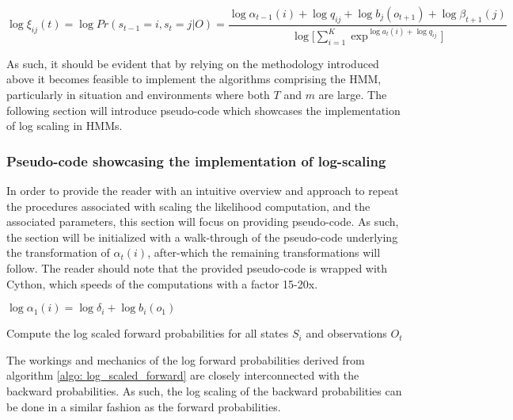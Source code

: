 \begin{equation}
    \log\xi_{ij}(t) = \log Pr(s_{t-1}=i, s_t=j|O) =
    \frac{\log\alpha_{t-1}(i) + \log q_{ij} + \log b_j(o_{t+1}) + \log \beta_{t+1}(j)}{\log\Big[\sum_{i=1}^K \exp^{\log a_t(i)+\log q_{ij}}\Big]}
    \label{eq: log xi}
\end{equation}

As such, it should be evident that by relying on the methodology introduced above it becomes feasible to implement the algorithms comprising the HMM, particularly in situation and environments where both $T$ and $m$ are large. The following section will introduce pseudo-code which showcases the implementation of log scaling in HMMs. 

\subsubsection{Pseudo-code showcasing the implementation of log-scaling}
In order to provide the reader with an intuitive overview and approach to repeat the procedures associated with scaling the likelihood computation, and the associated parameters, this section will focus on providing pseudo-code. As such, the section will be initialized with a walk-through of the pseudo-code underlying the transformation of $\alpha_t(i)$, after-which the remaining transformations will follow. The reader should note that the provided pseudo-code is wrapped with Cython, which speeds of the computations with a factor 15-20x.

\begin{algorithm}[H]

    {$\log\alpha_{1}(i) = \log\delta_i + \log b_i(o_1) $}  \;
        
\caption{Compute the log scaled forward probabilities for all states $S_i$ and observations $O_t$}
\label{algo: log_scaled_forward}
\end{algorithm}

The workings and mechanics of the log forward probabilities derived from algorithm \ref{algo: log_scaled_forward} are closely interconnected with the backward probabilities. As such, the log scaling of the backward probabilities can be done in a similar fashion as the forward probabilities.   

